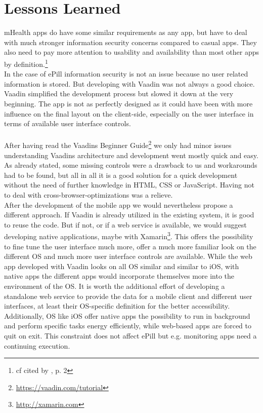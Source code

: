 \section{Lessons Learned}
\label{sec:LessonsLearned}
mHealth apps do have some similar requirements as any app, but have to deal with much stronger information security concerns compared to casual apps. They also need to pay more attention to usability and availability than most other apps by definition.\footnote{cf \cite{WorldHealthOrganization.2011} cited by \cite{MartinezPerez.2013}, p. 2}
\\
In the case of ePill information security is not an issue because no user related information is stored. But developing with Vaadin was not always a good choice. Vaadin simplified the development process but slowed it down at the very beginning. The app is not as perfectly designed as it could have been with more influence on the final layout on the client-side, especially on the user interface in terms of available user interface controls.
\\
\\
After having read the Vaadins Beginner Guide\footnote{\url{https://vaadin.com/tutorial}} we only had minor issues understanding Vaadins architecture and development went mostly quick and easy. As already stated, some missing controls were a drawback to us and workarounds had to be found, but all in all it is a good solution for a quick development without the need of further knowledge in HTML, CSS or JavaScript. Having not to deal with cross-browser-optimizations was a relieve.
\\
After the development of the mobile app we would nevertheless propose a different approach. If Vaadin is already utilized in the existing system, it is good to reuse the code. But if not, or if a web service is available, we would suggest developing native applications, maybe with Xamarin\footnote{\url{http://xamarin.com}}. This offers the possibility to fine tune the user interface much more, offer a much more familiar look on the different OS and much more user interface controls are available. While the web app developed with Vaadin looks on all OS similar and similar to iOS, with native apps the different apps would incorporate themselves more into the environment of the OS. It is worth the additional effort of developing a standalone web service to provide the data for a mobile client and different user interfaces, at least their OS-specific definition for the better accessibility. Additionally, OS like iOS offer native apps the possibility to run in background and perform specific tasks energy efficiently, while web-based apps are forced to quit on exit. This constraint does not affect ePill but e.g. monitoring apps need a continuing execution.
